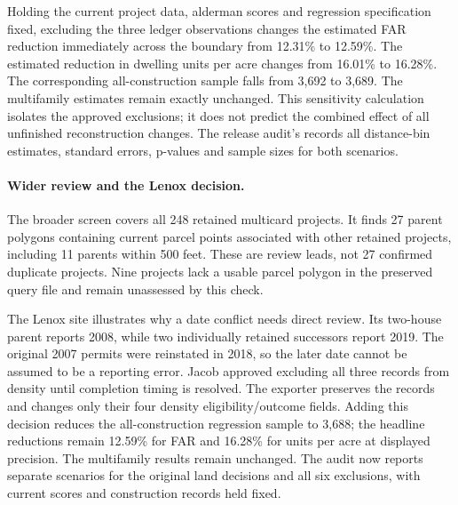 Holding the current project data, alderman scores and regression specification
fixed, excluding the three ledger observations changes the estimated FAR
reduction immediately across the boundary from 12.31\% to 12.59\%. The estimated
reduction in dwelling units per acre changes from 16.01\% to 16.28\%.
The corresponding all-construction sample falls from 3,692 to 3,689.
The multifamily estimates remain exactly unchanged. This sensitivity calculation
isolates the approved exclusions; it does not predict the combined effect of
all unfinished reconstruction changes. The release audit's
 records all distance-bin estimates,
standard errors, p-values and sample sizes for both scenarios.

\paragraph{Wider review and the Lenox decision.}
The broader screen covers all 248 retained multicard projects. It finds 27
parent polygons containing current parcel points associated with other retained
projects, including 11 parents within 500 feet. These are review leads, not 27
confirmed duplicate projects. Nine projects lack a usable parcel polygon in the
preserved query file and remain unassessed by this check.

The Lenox site illustrates why a date conflict needs direct review. Its two-house
parent reports 2008, while two individually retained successors report 2019.
The original 2007 permits were reinstated in 2018, so the later date cannot be
assumed to be a reporting error. Jacob approved excluding all three records
from density until completion timing is resolved. The exporter preserves the
records and changes only their four density eligibility/outcome fields.
Adding this decision reduces the all-construction regression sample to 3,688;
the headline reductions remain 12.59\% for FAR and 16.28\% for units per acre
at displayed precision. The multifamily results remain unchanged. The audit
now reports separate scenarios for the original land decisions and all six
exclusions, with current scores and construction records held fixed.

